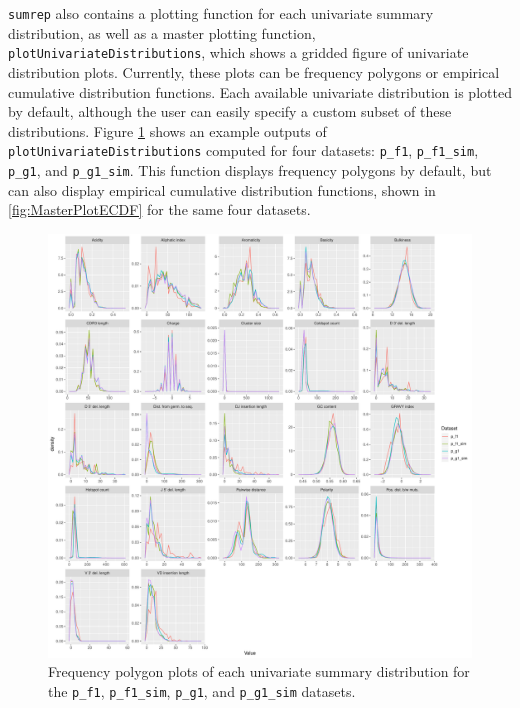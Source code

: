 \documentclass{article}
\begin{document}
\texttt{sumrep} also contains a plotting function for each univariate summary distribution, as well as a master plotting function, \texttt{plotUnivariateDistributions}, which shows a gridded figure of univariate distribution plots.
Currently, these plots can be frequency polygons or empirical cumulative distribution functions.
Each available univariate distribution is plotted by default, although the user can easily specify a custom subset of these distributions.
Figure \ref{fig:MasterPlot} shows an example outputs of \texttt{plotUnivariateDistributions} computed for four datasets: \texttt{p\_f1}, \texttt{p\_f1\_sim}, \texttt{p\_g1}, and \texttt{p\_g1\_sim}.
This function displays frequency polygons by default, but can also display empirical cumulative distribution functions, shown in \ref{fig:MasterPlotECDF} for the same four datasets.
\begin{figure}
    \includegraphics[width=\linewidth]{Figures/partis_freqpoly.pdf}
    \caption{Frequency polygon plots of each univariate summary distribution for the \texttt{p\_f1}, \texttt{p\_f1\_sim}, \texttt{p\_g1}, and \texttt{p\_g1\_sim} datasets.}
    \label{fig:MasterPlot}
\end{figure}
\end{document}

